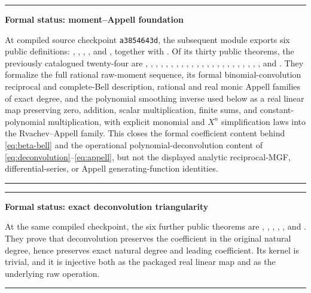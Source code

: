 \documentclass[11pt,oneside]{article}
\numberwithin{equation}{section}
\theoremstyle{definition}
\theoremstyle{remark}
\newenvironment{statusbox}[1]{%
  \par\smallskip\noindent\begin{center}\begin{minipage}{0.94\textwidth}%
  \hrule\vspace{0.55em}\noindent\textbf{#1}\par\smallskip
}{%
  \vspace{0.55em}\hrule\end{minipage}\end{center}\smallskip
}
\begin{document}
\begin{statusbox}{Formal status: moment--Appell foundation}
At compiled source checkpoint \texttt{a3854643d}, the subsequent module
 exports six public definitions:
, ,
, , and
, together with
.  Of its thirty public theorems, the
previously catalogued twenty-four are
, ,
, ,
,
,
,
,
,
,
,
,
,
,
,
,
,
,
,
,
,
,
, and
.  They
formalize the full rational raw-moment sequence, its formal
binomial-convolution reciprocal and complete-Bell description, rational and
real monic Appell families of exact degree, and the polynomial smoothing
inverse used below as a real linear map preserving zero, addition, scalar
multiplication, finite sums, and constant-polynomial multiplication, with
explicit monomial and $X^n$ simplification laws into the Rvachev--Appell
family.  This
closes the formal coefficient content behind
\eqref{eq:beta-bell} and the operational polynomial-deconvolution content of
\eqref{eq:deconvolution}--\eqref{eq:appell}, but not the displayed analytic
reciprocal-MGF, differential-series, or Appell generating-function identities.
\end{statusbox}

\begin{statusbox}{Formal status: exact deconvolution triangularity}
At the same compiled checkpoint, the six further public theorems are
,
,
,
,
, and
.  They prove that deconvolution
preserves the coefficient in the original natural degree, hence preserves
exact natural degree and leading coefficient.  Its kernel is trivial, and it
is injective both as the packaged real linear map and as the underlying raw
operation.
\end{statusbox}
\end{document}
